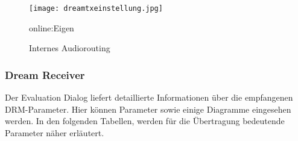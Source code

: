 \begin{figure}[H]
	\centering
	\texttt{[image: dreamtxeinstellung.jpg]}
	\caption[Internes Audiorouting]{Internes Audiorouting} \gls{online:Eigen}
	\label{fig:dreamtxeinstellung}
\end{figure}

\subsubsection{Dream Receiver}
\label{subsec:Unterabschnitt12}

Der Evaluation Dialog liefert detaillierte Informationen über die empfangenen DRM-Parameter. Hier können Parameter sowie einige Diagramme eingesehen werden. In den folgenden Tabellen, werden für die Übertragung bedeutende Parameter näher erläutert.

